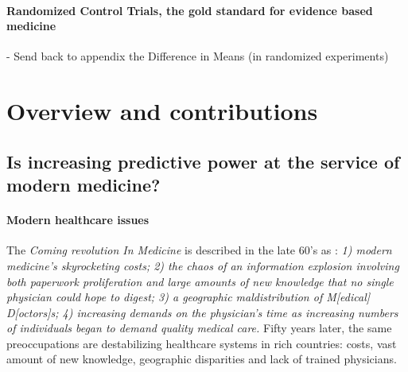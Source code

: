 \documentclass[french,12pt,twoside,a4paper]{book}
\begin{document}
\begin{background_box_left}
  \paragraph{Randomized Control Trials, the gold standard for evidence based medicine}

  - Send back to appendix the Difference in Means  (in randomized experiments)


\end{background_box_left}

\section{Overview and contributions}\label{sec:intro:contributions}

\subsection{Is increasing predictive power at the service of modern medicine?}%
\label{subsec:intro:questions}%

\paragraph{Modern healthcare issues}

The \emph{Coming revolution In Medicine} is described in the late 60's as
\citep{rutstein1967coming}: \textit{1) modern medicine's skyrocketing costs; 2)
  the chaos of an information explosion involving both paperwork proliferation and
  large amounts of new knowledge that no single physician could hope to digest; 3)
  a geographic maldistribution of M[edical] D[octors]s; 4) increasing demands on
  the physician's time as increasing numbers of individuals began to demand
  quality medical care.} Fifty years later, the same preoccupations are
destabilizing healthcare systems in rich countries: costs, vast amount of new
knowledge, geographic disparities and lack of trained physicians.

\end{document}
